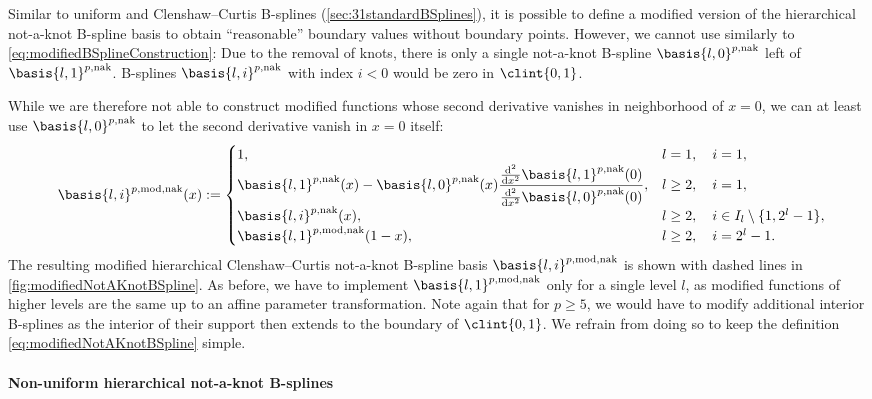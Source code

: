 Similar to uniform and Clenshaw--Curtis B-splines
(\cref{sec:31standardBSplines}),
it is possible to define a modified version of the
hierarchical not-a-knot B-spline basis to obtain
``reasonable'' boundary values without boundary points.
However, we cannot use  similarly to
\eqref{eq:modifiedBSplineConstruction}:
Due to the removal of knots, there is only a single
not-a-knot B-spline $\basis{l,0}^{p,\notaknot}$ left of
$\basis{l,1}^{p,\notaknot}$.
B-splines $\basis{l,i}^{p,\notaknot}$ with index $i < 0$
would be zero in $\clint{0, 1}$.

While we are therefore not able to construct modified functions
whose second derivative vanishes in neighborhood of $x = 0$,
we can at least use $\basis{l,0}^{p,\notaknot}$ to let the
second derivative vanish in $x = 0$ itself:
\begin{equation}
  \label{eq:modifiedNotAKnotBSpline}
  \basis{l,i}^{p,\modified,\notaknot}(x)
  :=
  \begin{cases}
    1,&
    l = 1,\quad i = 1,\\
    \basis{l,1}^{p,\notaknot}(x)
    - \basis{l,0}^{p,\notaknot}(x)
    \dfrac{\frac{\diff^2}{\dx^2} \basis{l,1}^{p,\notaknot}(0)}%
    {\frac{\diff^2}{\dx^2} \basis{l,0}^{p,\notaknot}(0)},&
    l \ge 2,\quad i = 1,\\
    \basis{l,i}^{p,\notaknot}(x),&
    l \ge 2,\quad i \in I_l \setminus \{1, 2^l - 1\},\\
    \basis{l,1}^{p,\modified,\notaknot}(1 - x),&
    l \ge 2,\quad i = 2^l - 1.
  \end{cases}
  \hspace*{-2mm}
\end{equation}
The resulting modified hierarchical Clenshaw--Curtis not-a-knot B-spline basis
$\basis{l,i}^{p,\modified,\notaknot}$ is shown with dashed lines
in \cref{fig:modifiedNotAKnotBSpline}.
As before, we have to implement $\basis{l,1}^{p,\modified,\notaknot}$
only for a single level $l$, as modified functions of higher levels
are the same up to an affine parameter transformation.
Note again that for $p \ge 5$, we would have to modify additional
interior B-splines as the interior of their support then extends to the
boundary of $\clint{0, 1}$.
We refrain from doing so to keep the definition
\eqref{eq:modifiedNotAKnotBSpline} simple.

\paragraph{Non-uniform hierarchical not-a-knot B-splines}

